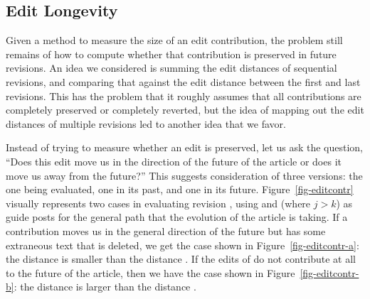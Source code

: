 \subsection{Edit Longevity}

Given a method to measure the size of an edit contribution,
the problem still remains of how to compute whether that
contribution is preserved in future revisions.
An idea we considered is summing the edit distances of
sequential revisions, and comparing that against the edit
distance between the first and last revisions.
This has the problem that it roughly assumes that all
contributions are completely preserved or completely
reverted, but the idea of mapping out the edit distances of
multiple revisions led to another idea that we favor.

Instead of trying to measure whether an edit is preserved,
let us ask the question, ``Does this edit move us in the
direction of the future of the article or does it move us away
from the future?''
This suggests consideration of three versions: the one being
evaluated, one in its past, and one in its future.
Figure~\ref{fig-editcontr} visually represents two cases in
evaluating revision , using 
and  (where $j > k$) as guide posts for the general
path that the evolution of the article is taking.
If a contribution moves us in the general direction of
the future but has some extraneous text that is deleted,
we get the case shown in Figure~\ref{fig-editcontr-a}:
the distance  is smaller than the distance .
If the edits of  do not contribute at all to the
future of the article, then we have the case shown in
Figure~\ref{fig-editcontr-b}:
the distance  is larger than the distance .

